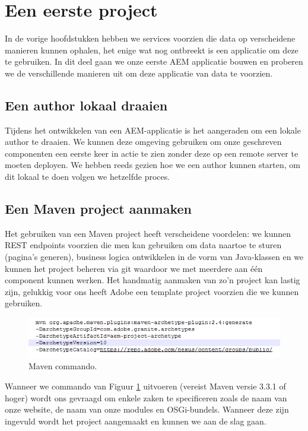 \documentclass{article}
\begin{document}
	\newpage
	\section{Een eerste project}
	In de vorige hoofdstukken hebben we services voorzien die data op verscheidene manieren kunnen ophalen, het enige wat nog ontbreekt is een applicatie om deze te gebruiken. In dit deel gaan we onze eerste AEM applicatie bouwen en proberen we de verschillende manieren uit om deze applicatie van data te voorzien.
	\subsection{Een author lokaal draaien}
	Tijdens het ontwikkelen van een AEM-applicatie is het aangeraden om een lokale author te draaien. We kunnen deze omgeving gebruiken om onze geschreven componenten een eerste keer in actie te zien zonder deze op een remote server te moeten deployen. We hebben reeds gezien hoe we een author kunnen starten, om dit lokaal te doen volgen we hetzelfde proces.
	\subsection{Een Maven project aanmaken}
		Het gebruiken van een Maven project heeft verscheidene voordelen: we kunnen REST endpoints voorzien die men kan gebruiken om data naartoe te sturen (pagina's generen), business logica ontwikkelen in de vorm van Java-klassen en we kunnen het project beheren via git waardoor we met meerdere aan één component kunnen werken. Het handmatig aanmaken van zo'n project kan lastig zijn, gelukkig voor ons heeft Adobe een template project voorzien die we kunnen gebruiken.
		
	\begin{figure}[h!]
  		\includegraphics[width=\linewidth]{images/maven-archetype.PNG}
  		\caption{Maven commando.}
  		\label{fig:maven-archetype}
	\end{figure}

Wanneer we commando van Figuur \ref{fig:maven-archetype} uitvoeren (vereist Maven versie 3.3.1 of hoger) wordt ons gevraagd om enkele zaken te specificeren zoals de naam van onze website, de naam van onze modules en OSGi-bundels. Wanneer deze zijn ingevuld wordt het project aangemaakt en kunnen we aan de slag gaan.
\end{document}
